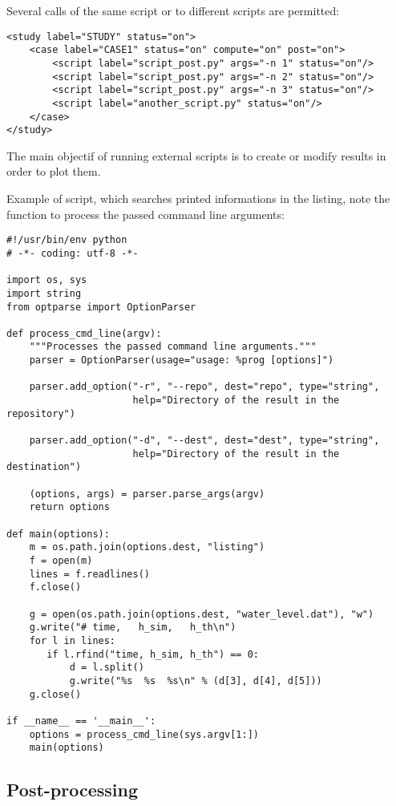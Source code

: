 \documentclass[a4paper,10pt,twoside]{article}
\begin{document}
Several calls of the same script or to different scripts are permitted:
\begin{verbatim}
<study label="STUDY" status="on">
    <case label="CASE1" status="on" compute="on" post="on">
        <script label="script_post.py" args="-n 1" status="on"/>
        <script label="script_post.py" args="-n 2" status="on"/>
        <script label="script_post.py" args="-n 3" status="on"/>
        <script label="another_script.py" status="on"/>
    </case>
</study>
\end{verbatim}

The main objectif of running external scripts is to create or modify
results in order to plot them.

Example of script, which searches printed informations in the listing,
note the function to process the passed command line arguments:
\begin{verbatim}
#!/usr/bin/env python
# -*- coding: utf-8 -*-

import os, sys
import string
from optparse import OptionParser

def process_cmd_line(argv):
    """Processes the passed command line arguments."""
    parser = OptionParser(usage="usage: %prog [options]")

    parser.add_option("-r", "--repo", dest="repo", type="string",
                      help="Directory of the result in the repository")

    parser.add_option("-d", "--dest", dest="dest", type="string",
                      help="Directory of the result in the destination")

    (options, args) = parser.parse_args(argv)
    return options

def main(options):
    m = os.path.join(options.dest, "listing")
    f = open(m)
    lines = f.readlines()
    f.close()

    g = open(os.path.join(options.dest, "water_level.dat"), "w")
    g.write("# time,   h_sim,   h_th\n")
    for l in lines:
       if l.rfind("time, h_sim, h_th") == 0:
           d = l.split()
           g.write("%s  %s  %s\n" % (d[3], d[4], d[5]))
    g.close()

if __name__ == '__main__':
    options = process_cmd_line(sys.argv[1:])
    main(options)
\end{verbatim}

\subsection{Post-processing}
\end{document}
